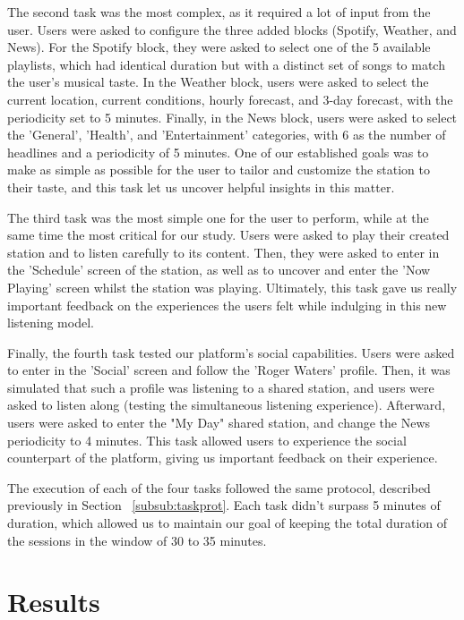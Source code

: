 The second task was the most complex, as it required a lot of input from the user. Users were asked to configure the three added blocks (Spotify, Weather, and News). For the Spotify block, they were asked to select one of the 5 available playlists, which had identical duration but with a distinct set of songs to match the user's musical taste. In the Weather block, users were asked to select the current location, current conditions, hourly forecast, and 3-day forecast, with the periodicity set to 5 minutes. Finally, in the News block, users were asked to select the 'General', 'Health', and 'Entertainment' categories, with 6 as the number of headlines and a periodicity of 5 minutes. One of our established goals was to make as simple as possible for the user to tailor and customize the station to their taste, and this task let us uncover helpful insights in this matter.

The third task was the most simple one for the user to perform, while at the same time the most critical for our study. Users were asked to play their created station and to listen carefully to its content. Then, they were asked to enter in the 'Schedule' screen of the station, as well as to uncover and enter the 'Now Playing' screen whilst the station was playing. Ultimately, this task gave us really important feedback on the experiences the users felt while indulging in this new listening model.

Finally, the fourth task tested our platform's social capabilities. Users were asked to enter in the 'Social' screen and follow the 'Roger Waters' profile. Then, it was simulated that such a profile was listening to a shared station, and users were asked to listen along (testing the simultaneous listening experience). Afterward, users were asked to enter the "My Day" shared station, and change the News periodicity to 4 minutes. This task allowed users to experience the social counterpart of the platform, giving us important feedback on their experience.

The execution of each of the four tasks followed the same protocol, described previously in Section ~\ref{subsub:taskprot}. Each task didn't surpass 5 minutes of duration, which allowed us to maintain our goal of keeping the total duration of the sessions in the window of 30 to 35 minutes.

\section{Results}

